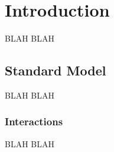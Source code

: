 \documentclass[final]{ukthesis}
\begin{document}
\tableofcontents\clearpage
\listoffigures\clearpage
\listoftables\clearpage
\mainmatter
\DoubleSpacing
\chapter{Introduction}
\label{ch:Introduction}

BLAH BLAH


\section{Standard Model}
\label{sec:Standard_Model}

BLAH BLAH

\subsection{Interactions}
\label{sec:Ints}
BLAH BLAH


\copyrightnotice
\backmatter
 

%
\end{document}
